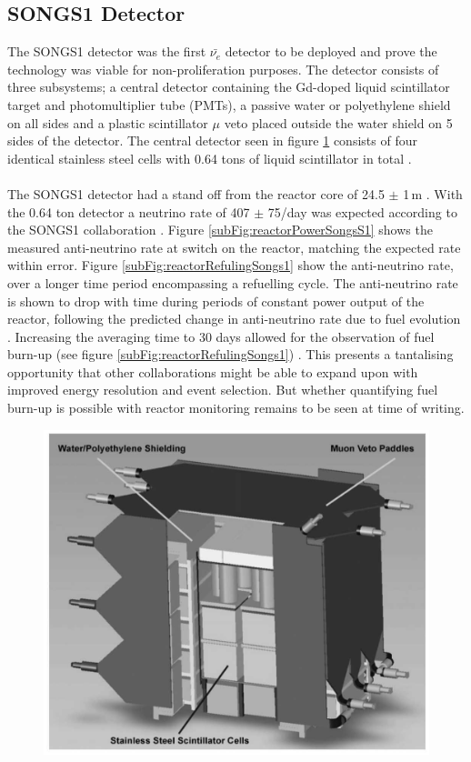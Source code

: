 \subsection{SONGS1 Detector}
The SONGS1 detector \cite{Bowden_2007} was the first $\bar{\nu_e}$ detector to be deployed and prove the technology was viable for non-proliferation purposes. The detector consists of three subsystems; a central detector containing the Gd-doped liquid scintillator target and photomultiplier tube (PMTs), a passive water or polyethylene shield on all sides and a plastic scintillator $\mu$ veto placed outside the water shield on 5 sides of the detector. The central detector seen in figure \ref{fig:SongsS1Detector} consists of four identical stainless steel cells with 0.64 tons of liquid scintillator in total \cite{Bowden_2007}. 
\\\\The SONGS1 detector had a stand off from the reactor core of 24.5 $\pm$ 1\,m \cite{Bowden_2007}. With the 0.64 ton detector a neutrino rate of 407 $\pm$ 75/day was expected according to the SONGS1 collaboration \cite{Bowden_2007}. Figure \ref{subFig:reactorPowerSongsS1} shows the measured anti-neutrino rate at switch on the reactor, matching the expected rate within error. Figure \ref{subFig:reactorRefulingSongs1} show the anti-neutrino rate, over a longer time period encompassing a refuelling cycle. The anti-neutrino rate is shown to drop with time during periods of constant power output of the reactor, following the predicted change in anti-neutrino rate due to fuel evolution \cite{Bowden_2008}. Increasing the averaging time to 30 days allowed for the observation of fuel burn-up (see figure \ref{subFig:reactorRefulingSongs1}) \cite{Bowden_2008}. This presents a tantalising opportunity that other collaborations might be able to expand upon with improved energy resolution and event selection. But whether quantifying fuel burn-up is possible with reactor monitoring remains to be seen at time of writing. 

\begin{figure}[!h]
 \centering
 \includegraphics[width=0.5\linewidth]{Chapter1/Figs/SongsS1Detector.jpg}
 \label{fig:SongsS1Detector}
\end{figure}

